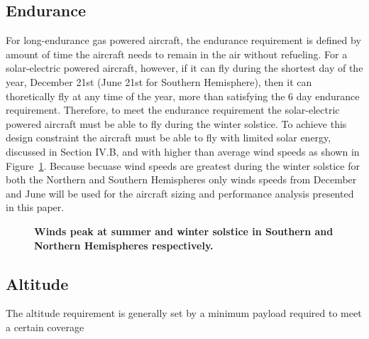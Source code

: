 \subsection{Endurance}

For long-endurance gas powered aircraft, the endurance requirement is defined by amount of time the aircraft needs to remain in the air without refueling.  
For a solar-electric powered aircraft, however, if it can fly during the shortest day of the year, December 21st (June 21st for Southern Hemisphere), then it can thoretically fly at any time of the year, more than satisfying the 6 day endurance requirement. 
Therefore, to meet the endurance requirement the solar-electric powered aircraft must be able to fly during the winter solstice.  
To achieve this design constraint the aircraft must be able to fly with limited solar energy, discussed in Section IV.B, and with higher than average wind speeds as shown in Figure~\ref{f:windvsmonth}.  
Because becuase wind speeds are greatest during the winter solstice for both the Northern and Southern Hemispheres only winds speeds from December and June will be used for the aircraft sizing and performance analysis presented in this paper. 

\begin{figure}[H]
 \begin{subfigmatrix}{2}%
 \end{subfigmatrix}
 \caption{\textbf{Winds peak at summer and winter solstice in Southern and Northern Hemispheres respectively.\cite{wind}}}
 \label{f:windvsmonth}
\end{figure}


\subsection{Altitude}

The altitude requirement is generally set by a minimum payload required to meet a certain coverage

